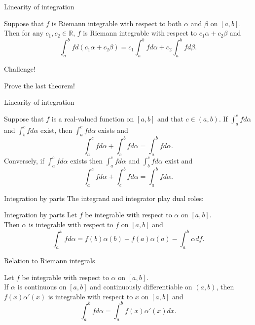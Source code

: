 \documentclass{beamer}
\begin{document}
\begin{frame}{Linearity of integration}
\begin{thm}
Suppose that $f$ is Riemann integrable with respect to both $\alpha$ and $\beta$ on $[a,b]$.\\
\pause
Then for any $c_1,c_2\in\mathbb{R}$, $f$ is Riemann integrable with respect to $c_1\alpha + c_2\beta$ and
$$\int_a^b f d(c_1\alpha + c_2\beta) = c_1\int_a^b f d\alpha + c_2\int_a^b f d\beta.$$
\end{thm}
\end{frame}

\begin{frame}{Challenge!}
\begin{prob}
Prove the last theorem!
\end{prob}
\end{frame}

\begin{frame}{Linearity of integration}
\begin{thm}
Suppose that $f$ is a real-valued function on $[a,b]$ and that $c\in (a,b)$.
\pause
If $\int_a^c fd\alpha$ and $\int_b^c fd\alpha$ exist, then $\int_a^cfd\alpha$ exists and
$$\int_a^c fd\alpha + \int_c^b fd\alpha = \int_a^b fd\alpha.$$
\pause
Conversely, if $\int_a^c fd\alpha$ exists then $\int_a^c fd\alpha$ and $\int_b^c fd\alpha$ exist and
$$\int_a^c fd\alpha + \int_c^b fd\alpha = \int_a^b fd\alpha.$$
\end{thm}
\end{frame}

\begin{frame}{Integration by parts}
The integrand and integrator play dual roles:
\begin{thm}{Integration by parts}
Let $f$ be integrable with respect to $\alpha$ on $[a,b]$.\\
Then $\alpha$ is integrable with respect to $f$ on $[a,b]$ and
$$\int_a^b f d\alpha = f(b)\alpha(b)-f(a)\alpha(a)-\int_a^b \alpha df.$$
\end{thm}
\end{frame}

\begin{frame}{Relation to Riemann integrals}
\begin{thm}
Let $f$ be integrable with respect to $\alpha$ on $[a,b]$.\\
If $\alpha$ is continuous on $[a,b]$ and continuously differentiable on $(a,b)$, then
$f(x)\alpha'(x)$ is integrable with respect to $x$ on $[a,b]$ and
$$\int_a^b f d\alpha = \int_a^bf(x)\alpha'(x)dx.$$
\end{thm}
\end{frame}
\end{document}
